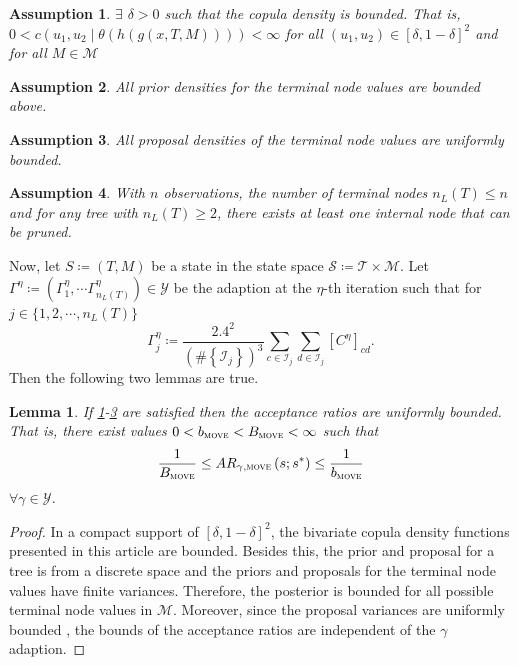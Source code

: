 \documentclass[
12pt]{article}
\newtheorem{lemma}{Lemma}[section]
\newtheorem{assumption}{Assumption}[section]
\begin{document}
\begin{assumption}\label{ass:bounded:cop}
	$\exists$ \(\delta>0\) such that the copula density is bounded. That is, $0 < c(u_1,u_2\mid\theta(h(g(x,T,M)))) < \infty$ for all $(u_1,u_2)\in[\delta,1-\delta]^2$ and for all $M \in \mathcal{M}$
\end{assumption}
\begin{assumption}\label{ass:bounded:prior}
	All prior densities for the terminal node values are bounded above.
\end{assumption}
\begin{assumption}\label{ass:bounded:prop}
	All proposal densities of the terminal node values are uniformly bounded.
\end{assumption}
\begin{assumption}\label{ass:bounded:tree}
	With $n$ observations, the number of terminal nodes $n_L(T)\le n$ and for any tree with $n_L(T)\ge 2$, there exists at least one internal node that can be pruned.
\end{assumption}


Now, let $S\coloneqq \left(T,M\right)$ be a state in the state space $\mathcal{S}\coloneqq\mathcal{T}\times \mathcal{M}$. Let $\Gamma^{\eta} \coloneqq \left(\Gamma_{1}^{\eta}, \cdots\Gamma^{\eta}_{n_L(T)}\right)\in\mathcal{Y}$ be the adaption at the $\eta$-th iteration such that for $j \in \{1,2,\cdots, n_L(T)\}$
\begin{equation*}
	\Gamma^{\eta}_{j} \coloneqq \frac{2.4^2}{\left(\#\left\{\mathcal{I}_{j}\right\}\right)^3}
	\sum_{c\in\mathcal{I}_{j}}\sum_{d\in\mathcal{I}_{j}}\left[C^{\eta}\right]_{cd}.
\end{equation*}
Then the following two lemmas are true.

\begin{lemma}\label{lemm:bounded:ratio}
	If \cref{ass:bounded:cop}-\cref{ass:bounded:prop} are satisfied then the acceptance ratios are uniformly bounded. That is, there exist values $0< b_{\textsc{move}} <  B_{\textsc{move}} < \infty$ such that
	\begin{equation*}
		\frac{1}{B_{\textsc{move}}} \le AR_{\gamma, \textsc{move}}\left(s;s^{\ast}\right) \le \frac{1}{b_{\textsc{move}}}
	\end{equation*}
	$\forall\gamma \in \mathcal{Y}$.
\end{lemma}

\begin{proof}
	In a compact support of $[\delta,1-\delta]^2$, the bivariate copula density functions presented in this article are bounded. Besides this, the prior and proposal for a tree is from a discrete space and the priors and proposals for the terminal node values have finite variances. Therefore, the posterior is bounded for all possible terminal node values in $\mathcal{M}$. Moreover, since the proposal variances are uniformly bounded \citep{haario_AMH}, the bounds of the acceptance ratios are independent of the $\gamma$ adaption.
\end{proof}
\end{document}
